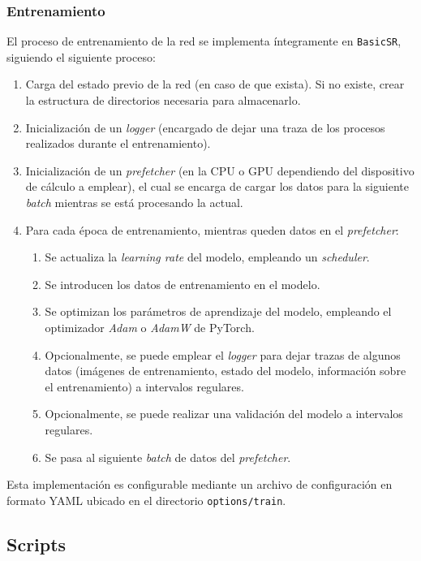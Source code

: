 \documentclass[a4paper]{article}
\begin{document}
\subsubsection{Entrenamiento}

El proceso de entrenamiento de la red se implementa íntegramente en \texttt{BasicSR}, siguiendo el siguiente proceso:

\begin{enumerate}
  \item{Carga del estado previo de la red (en caso de que exista). Si no existe, crear la estructura de directorios necesaria para almacenarlo.}
  \item{Inicialización de un \textit{logger} (encargado de dejar una traza de los procesos realizados durante el entrenamiento).}
  \item{Inicialización de un \textit{prefetcher} (en la CPU o GPU dependiendo del dispositivo de cálculo a emplear), el cual se encarga de cargar los datos para la siguiente \textit{batch} mientras se está procesando la actual.}
  \item{Para cada época de entrenamiento, mientras queden datos en el \textit{prefetcher}:
    \begin{enumerate}
      \item{Se actualiza la \textit{learning rate} del modelo, empleando un \textit{scheduler}.}
      \item{Se introducen los datos de entrenamiento en el modelo.}
      \item{Se optimizan los parámetros de aprendizaje del modelo, empleando el optimizador \textit{Adam} o \textit{AdamW} de PyTorch.}
      \item{Opcionalmente, se puede emplear el \textit{logger} para dejar trazas de algunos datos (imágenes de entrenamiento, estado del modelo, información sobre el entrenamiento) a intervalos regulares.}
      \item{Opcionalmente, se puede realizar una validación del modelo a intervalos regulares.}
      \item{Se pasa al siguiente \textit{batch} de datos del \textit{prefetcher}.}
    \end{enumerate}
  }
\end{enumerate}

Esta implementación es configurable mediante un archivo de configuración en formato YAML ubicado en el directorio \texttt{options/train}.

\subsection{Scripts}
\end{document}

